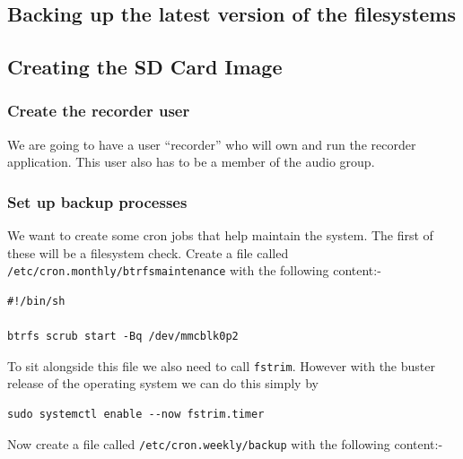 \documentclass[Draft]{akc}
\begin{document}
\subsection{Backing up the latest version of the filesystems}

\subsection{Creating the SD Card Image}












\subsubsection{Create the recorder user}

We are going to have a user ``recorder'' who will own and run the recorder
application. This user also has to be a member of the audio group.
  
\subsubsection{Set up backup processes}

We want to create some cron jobs that help maintain the system.  The first of these will be a
filesystem check.  Create a file called \texttt{/etc/cron.monthly/btrfsmaintenance} with the
following content:-

\begin{lstlisting}
#!/bin/sh

btrfs scrub start -Bq /dev/mmcblk0p2

\end{lstlisting}

To sit alongside this file we also need to call \texttt{fstrim}.  However with the buster release of
the operating system we can do this simply by
\begin{lstlisting}
sudo systemctl enable --now fstrim.timer
\end{lstlisting}

Now create a file called \texttt{/etc/cron.weekly/backup} with the following content:-
\end{document}
